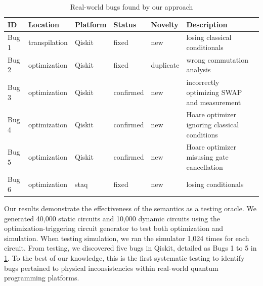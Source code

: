 \begin{table}[t]
	\centering
	\caption{Real-world bugs found by our approach}
	\label{table:bugs}
	{\footnotesize
		\begin{tabular}{@{}lllllll@{}}
			\toprule
			ID    & Location      & Platform & Status    & Novelty   & Description                                   \\ \midrule
			Bug 1 & transpilation & Qiskit   & fixed     & new       & losing classical conditionals                 \\
			Bug 2 & optimization  & Qiskit   & fixed     & duplicate & wrong commutation analysis                    \\
			Bug 3 & optimization  & Qiskit   & confirmed & new       & incorrectly optimizing SWAP and measurement   \\
			Bug 4 & optimization  & Qiskit   & confirmed & new       & Hoare optimizer ignoring classical conditions \\
			Bug 5 & optimization  & Qiskit   & confirmed & new       & Hoare optimizer misusing gate cancellation    \\
			Bug 6 & optimization  & staq     & fixed     & new       & losing conditionals                           \\ \bottomrule
		\end{tabular}
	}
\end{table}

Our results demonstrate the effectiveness of the semantics as a testing oracle.
%
We generated 40,000 static circuits and 10,000 dynamic circuits using the
optimization-triggering circuit generator to test both optimization and
simulation.
%
When testing simulation, we ran the simulator 1,024 times for each circuit.
%
From testing, we discovered five bugs in Qiskit, detailed as Bugs 1 to 5 in
\cref{table:bugs}.
%
To the best of our knowledge, this is the first systematic testing to identify
bugs pertained to physical inconsistencies within real-world quantum
programming platforms.

